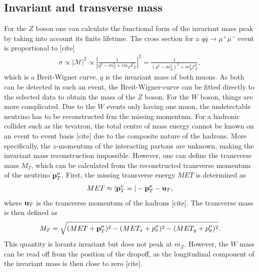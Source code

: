 \documentclass[twoside,        %
               BCOR12mm,       %
               ngerman,english, %
               fleqn,headsepline=false,footsepline=false
              ]{Vorlage/MFPREPORT}
\begin{document}
\subsection{Invariant and transverse mass}
For the $Z$ boson one can calculate the functional form of the invariant mass
peak by taking into account its finite lifetime.
The cross section for a $q\bar q\rightarrow \mu^+\mu^-$ event is proportional
to [cite]
\begin{align}
    \sigma\propto|\mathcal{M}|^2\propto\left|\frac{1}{q^2-m_Z^2+im_Z\Gamma_Z}\right|^2=\frac{1}{(q^2-m_Z^2)^2+m_Z^2\Gamma_Z^2},
    \label{eq:breit}
\end{align}which is a Breit-Wigner curve.
$q$ is the invariant mass of both muons. As both can be detected in such an
event, the Breit-Wigner-curve can be fitted directly to the selected data to
obtain the mass of the $Z$ boson.
For the $W$ boson, things are more complicated. Due to the $W$ events only
having one muon, the undetectable neutrino has to be reconstructed frm the
missing momentum. For a hadronic collider such as the tevatron, the total
centre of mass energy cannot be known on an event to event basis [cite] due to
the composite nature of the hadrons. More specifically, the $z$-momentum of the
interacting partons are unknown, making the invariant mass reconstruction
impossible. However, one can define the transverse mass $M_T$, which can be
calculated from the reconstructed transverse momentum of the neutrino
$\bold{p}_T^\mu$. First, the missing transverse energy $MET$ is determined as
\begin{align}
    MET\approx|\bold{p}_T^\nu=|-\bold{p}_T^\mu-\bold{u}_T,
    \label{eq:met}
\end{align}where $\bold{u}_T$ is the transverse momentum of the hadrons [cite].
The transverse mass is then defined as
\begin{align}
    M_T=\sqrt{(MET+\bold{p}_T^\mu)^2-(MET_x+p_x^\mu)^2-(MET_y+p_y^\mu)^2}.
    \label{eq:mt}
\end{align}
This quantity is lorantz invariant but does not peak at $m_Z$. However, the $W$
mass can be read off from the position of the dropoff, as the longitudinal
component of the invariant mass is then close to zero [cite].
\end{document}
